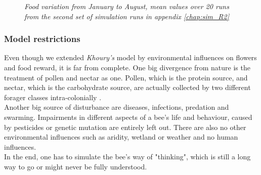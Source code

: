 		\begin{figure}[H]
			\centering
			\caption{\textit{Food variation from January to August, mean values over 20 runs from the second set of simulation runs in appendix \ref{chap:sim_R2} }}
			\label{fig:foodVariation}
		\end{figure}
	
	\subsubsection{Model restrictions}
		\label{chap:modelRestrictions}
		Even though we extended \textit{Khoury's} model by environmental influences on flowers and food reward, it is far from complete. One big divergence from nature is the treatment of pollen and nectar as one. Pollen, which is the protein source, and nectar, which is the carbohydrate source, are actually collected by two different forager classes intra-colonially \cite{schmickl07}.\\  Another big source of disturbance are diseases, infections, predation and swarming. Impairments in different aspects of a bee's life and behaviour, caused by pesticides or genetic mutation are entirely left out. There are also no other environmental influences such as aridity, wetland or weather and no human influences. \\
		In the end, one has to simulate the bee's way of "thinking", which is still a long way to go or might never be fully understood. %
		
	
